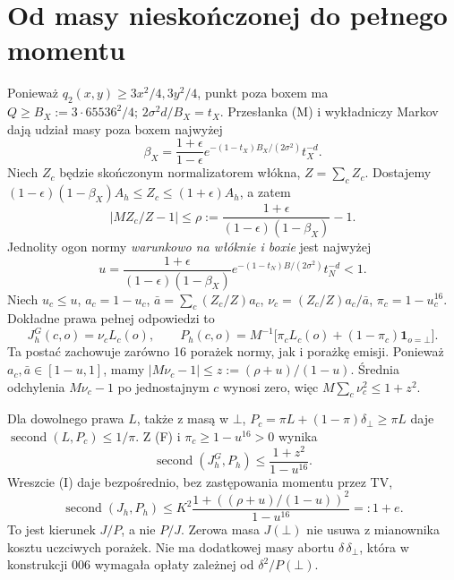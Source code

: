 \documentclass[11pt,a4paper]{article}
\newcommand{\botr}{\bot}\newcommand{\Sec}{\operatorname{second}}
\begin{document}
\section{Od masy nieskończonej do pełnego momentu}
Ponieważ $q_2(x,y)\ge3x^2/4,3y^2/4$, punkt poza boxem ma
$Q\ge B_X:=3\cdot65536^2/4$; $2\sigma^2d/B_X=t_X$.
Przesłanka (M) i wykładniczy Markov dają udział masy poza boxem najwyżej
\[
 \beta_X=\frac{1+\epsilon}{1-\epsilon}
 e^{-(1-t_X)B_X/(2\sigma^2)}t_X^{-d}.
\]
Niech $Z_c$ będzie skończonym normalizatorem włókna, $Z=\sum_cZ_c$.
Dostajemy $(1-\epsilon)(1-\beta_X)A_h\le Z_c\le(1+\epsilon)A_h$,
a zatem
\[
 \left|M Z_c/Z-1\right|\le\rho:=
 \frac{1+\epsilon}{(1-\epsilon)(1-\beta_X)}-1.
\]
Jednolity ogon normy \emph{warunkowo na włóknie i boxie} jest najwyżej
\[
 u=\frac{1+\epsilon}{(1-\epsilon)(1-\beta_X)}
 e^{-(1-t_N)B/(2\sigma^2)}t_N^{-d}<1.
\]
Niech $u_c\le u$, $a_c=1-u_c$, $\bar a=\sum_c(Z_c/Z)a_c$,
$\nu_c=(Z_c/Z)a_c/\bar a$, $\pi_c=1-u_c^{16}$.
Dokładne prawa pełnej odpowiedzi to
\[
 J^G_h(c,o)=\nu_c L_c(o),\qquad
 P_h(c,o)=M^{-1}\bigl[\pi_c L_c(o)+(1-\pi_c)\mathbf1_{o=\botr}\bigr]. \tag{F}
\]
Ta postać zachowuje zarówno 16 porażek normy, jak i porażkę emisji.
Ponieważ $a_c,\bar a\in[1-u,1]$, mamy
$|M\nu_c-1|\le z:=(\rho+u)/(1-u)$.
Średnia odchylenia $M\nu_c-1$ po jednostajnym $c$ wynosi zero, więc
$M\sum_c\nu_c^2\le1+z^2$.

Dla dowolnego prawa $L$, także z masą w $\botr$,
$P_c=\pi L+(1-\pi)\delta_{\botr}\ge\pi L$ daje
$\Sec(L,P_c)\le1/\pi$. Z (F) i $\pi_c\ge1-u^{16}>0$ wynika
\[
 \Sec(J^G_h,P_h)\le\frac{1+z^2}{1-u^{16}}.
\]
Wreszcie (I) daje bezpośrednio, bez zastępowania momentu przez TV,
\[
 \boxed{\Sec(J_h,P_h)\le K^2\frac{1+((\rho+u)/(1-u))^2}{1-u^{16}}=:1+e.} \tag{J/P}
\]
To jest kierunek $J/P$, a nie $P/J$. Zerowa masa $J(\botr)$ nie usuwa
z mianownika kosztu uczciwych porażek. Nie ma dodatkowej masy abortu
$\delta\,\delta_{\botr}$, która w konstrukcji 006 wymagała opłaty
zależnej od $\delta^2/P(\botr)$.
\end{document}
